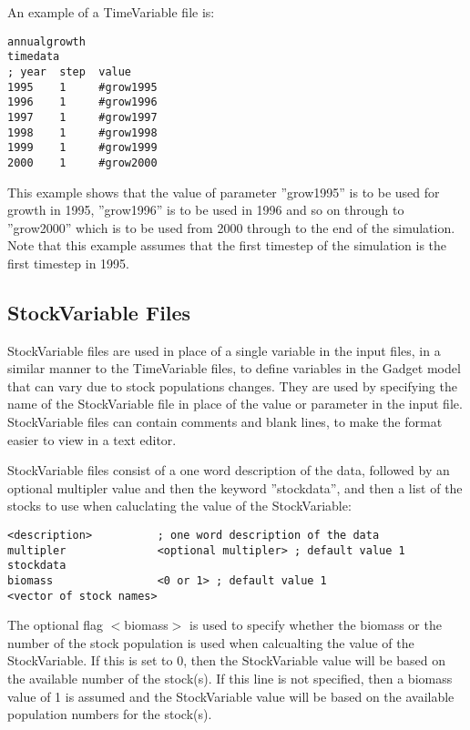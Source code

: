 \documentclass[10pt,twoside]{book}
\begin{document}
An example of a TimeVariable file is:

{\small\begin{verbatim}
annualgrowth
timedata
; year  step  value
1995    1     #grow1995
1996    1     #grow1996
1997    1     #grow1997
1998    1     #grow1998
1999    1     #grow1999
2000    1     #grow2000
\end{verbatim}}

This example shows that the value of parameter ''grow1995'' is to be used for growth in 1995, ''grow1996'' is to be used in 1996 and so on through to ''grow2000'' which is to be used from 2000 through to the end of the simulation.  Note that this example assumes that the first timestep of the simulation is the first timestep in 1995.

\subsection{StockVariable Files}\label{subsec:stockvar}
StockVariable files are used in place of a single variable in the input files, in a similar manner to the TimeVariable files, to define variables in the Gadget model that can vary due to stock populations changes.  They are used by specifying the name of the StockVariable file in place of the value or parameter in the input file.  StockVariable files can contain comments and blank lines, to make the format easier to view in a text editor.

\bigskip
StockVariable files consist of a one word description of the data, followed by an optional multipler value and then the keyword ''stockdata'', and then a list of the stocks to use when caluclating the value of the StockVariable:

{\small\begin{verbatim}
<description>          ; one word description of the data
multipler              <optional multipler> ; default value 1
stockdata
biomass                <0 or 1> ; default value 1
<vector of stock names>
\end{verbatim}}

The optional flag $<$biomass$>$ is used to specify whether the biomass or the number of the stock population is used when calcualting the value of the StockVariable.   If this is set to 0, then the StockVariable value will be based on the available number of the stock(s). If this line is not specified, then a biomass value of 1 is assumed and the StockVariable value will be based on the available population numbers for the stock(s).
\end{document}
